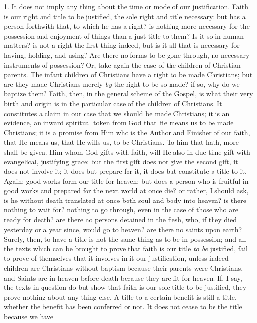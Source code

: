 1. It does not imply any thing about the time or mode of our
justification. Faith is our right and title to be justified, the sole
right and title necessary; but has a person forthwith that, to which
he has a right? is nothing more necessary for the possession and
enjoyment of things than a just title to them? Is it so in human
matters? is not a right the first thing indeed, but is it all that is
necessary for having, holding, and using? Are there no forms to be
gone through, no necessary instruments of possession? Or, take again
the case of the children of Christian parents. The infant children of
Christians have a right to be made Christians; but are they made
Christians merely \emph{by} the right to be so made? if so, why do we
baptize them? Faith, then, in the general scheme of the Gospel, is
what their very birth and origin is in the particular case of the
children of Christians. It constitutes a claim in our case that we
should be made Christians; it is an evidence, an inward spiritual
token from God that He means us to be made Christians; it is a promise
from Him who is the Author and Finisher of our faith, that He means
us, that He wills us, to be Christians. To him that hath, more shall
be given. Him whom God gifts with faith, will He also in due time gift
with evangelical, justifying grace: but the first gift does not give
the second gift, it does not involve it; it does but prepare for it,
it does but constitute a title to it. Again: good works form our title for heaven; but does a person who
is fruitful in good works and prepared for the next world at once die?
or rather, I should ask, is he without death translated at once both
soul and body into heaven? is there nothing to wait for? nothing to go
through, even in the case of those who are ready for death? are there
no persons detained in the flesh, who, if they died yesterday or a
year since, would go to heaven? are there no saints upon earth?
Surely, then, to have a title is not the same thing as to be in
possession; and all the texts which can be brought to prove that faith
is our title \emph{to be} justified, fail to prove of themselves that
it involves in it our justification, unless indeed children are
Christians without baptism because their parents were Christians, and
Saints are in heaven before death because they are fit for heaven. If,
I say, the texts in question do but show that faith is our sole title
to be justified, they prove nothing about any thing else. A title to a
certain benefit is still a title, whether the benefit has been
conferred or not. It does not cease to be the title because we have
